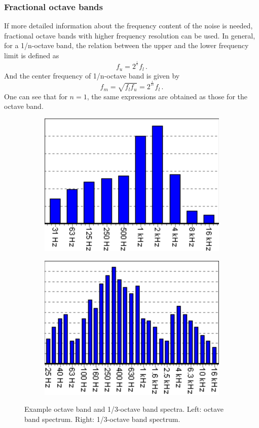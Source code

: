 \subsubsection*{Fractional octave bands}

If more detailed information about the frequency content of the noise is needed, fractional octave bands with higher frequency resolution can be used. In general, for a 1/n-octave band, the relation between the upper and the lower frequency limit is defined as
\begin{equation}
	f_u = 2^{^\frac{1}{n}}f_l\,.
\end{equation}
And the center frequency of 1/n-octave band is given by
\begin{equation}
	f_m = \sqrt{f_l f_u} = 2^{^{\frac{1}{2n}}}f_l\,.
\end{equation}
One can see that for $n = 1$, the same expressions are obtained as those for the octave band.

\begin{figure}[H]
	\centering
	\begin{subfigure}[b]{0.49\textwidth}
		\centering
		\includegraphics[width=0.8\linewidth]{fig/octave_band.PNG}
	\end{subfigure}
	\begin{subfigure}[b]{0.49\textwidth}
		\centering
		\includegraphics[width=0.8\linewidth]{fig/one_third_octave_band.PNG}
	\end{subfigure}
	\caption{Example octave band and 1/3-octave band spectra. Left: octave band spectrum. Right: 1/3-octave band spectrum. \cite{octave_band} }
	\label{fig:octave_band_filters}
\end{figure}

